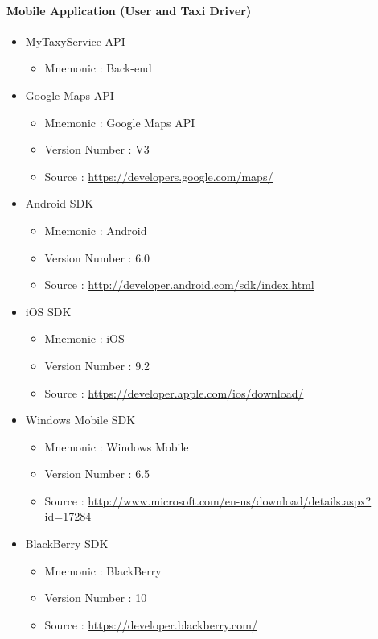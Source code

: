 \documentclass[12pt, a4paper]{article}
\begin{document}
\paragraph{Mobile Application (User and Taxi Driver)} 
\begin{itemize}
	\item MyTaxyService API
	\begin{itemize}
		\item Mnemonic : Back-end
	\end{itemize}
	\item Google Maps API
	\begin{itemize}
		\item Mnemonic : Google Maps API
		\item Version Number : V3
		\item Source : \url{https://developers.google.com/maps/} 
	\end{itemize}

	\item Android SDK
	\begin{itemize}
		\item Mnemonic : Android
		\item Version Number : 6.0
		\item Source : \url{http://developer.android.com/sdk/index.html} 
	\end{itemize}

	\item iOS SDK
	\begin{itemize}
		\item Mnemonic : iOS
		\item Version Number : 9.2
		\item Source : \url{https://developer.apple.com/ios/download/} 
	\end{itemize}

	\item Windows Mobile SDK
	\begin{itemize}
		\item Mnemonic : Windows Mobile
		\item Version Number : 6.5
		\item Source : \url{http://www.microsoft.com/en-us/download/details.aspx?id=17284} 
	\end{itemize}

	\item BlackBerry SDK
	\begin{itemize}
		\item Mnemonic : BlackBerry
		\item Version Number : 10
		\item Source : \url{https://developer.blackberry.com/} 
	\end{itemize}		
\end{itemize}
\end{document}
